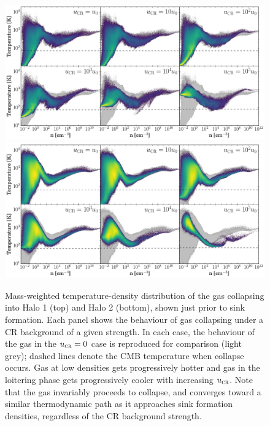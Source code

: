 \documentclass[../thesis.tex]{subfiles}
\begin{document}
\begin{figure}
\begin{center}
\includegraphics[width=\columnwidth]{figures/temp/temp}
\includegraphics[width=\columnwidth]{figures/temp/temp_halo2}
\caption{\label{fig:temp}
Mass-weighted temperature-density distribution of the gas collapsing into Halo 1 (top) and Halo 2 (bottom), shown just prior to sink formation. 
Each panel shows the behaviour of gas collapsing under a CR background of a given strength. 
In each case, the behaviour of the gas in the ${u}_{\textsc{cr}}=0$ case is reproduced for comparison (light grey); dashed lines denote the CMB temperature when collapse occurs. Gas at low densities gets progressively hotter and gas in the loitering phase gets progressively cooler with increasing ${u}_{\textsc{cr}}$. 
Note that the gas invariably proceeds to collapse, and converges toward a similar thermodynamic path as it approaches sink formation densities, regardless of the CR background strength.%
}
\end{center}
\end{figure}
\end{document}
